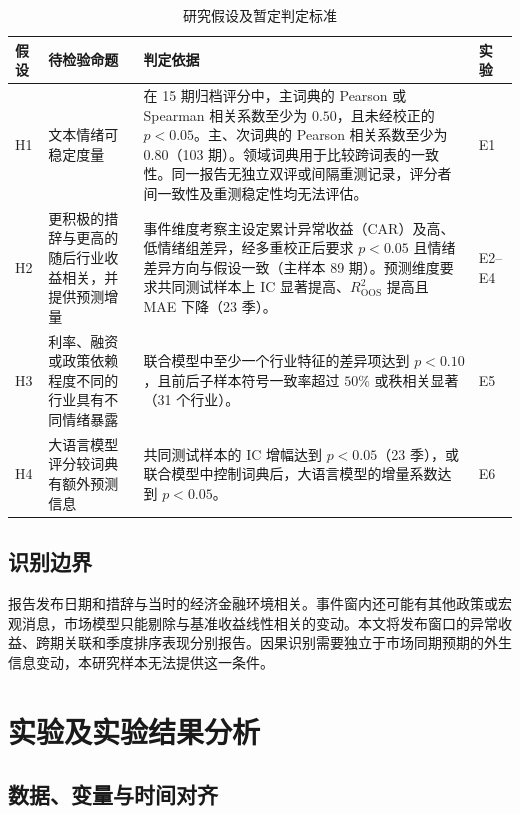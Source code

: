\begin{table}[htbp]
  \centering\small
  \caption{研究假设及暂定判定标准}
  \label{tab:hypothesis-rules}
  \begin{tabularx}{\linewidth}{@{}l p{.22\linewidth} X l@{}}
    \toprule
    假设 & 待检验命题 & 判定依据 & 实验 \\
    \midrule
    H1 & 文本情绪可稳定度量 & 在 15 期归档评分中，主词典的 Pearson 或 Spearman 相关系数至少为 $0.50$，且未经校正的 $p<0.05$。主、次词典的 Pearson 相关系数至少为 $0.80$（103 期）。领域词典用于比较跨词表的一致性。同一报告无独立双评或间隔重测记录，评分者间一致性及重测稳定性均无法评估。 & E1 \\
    H2 & 更积极的措辞与更高的随后行业收益相关，并提供预测增量 & 事件维度考察主设定累计异常收益（CAR）及高、低情绪组差异，经多重校正后要求 $p<0.05$ 且情绪差异方向与假设一致（主样本 89 期）。预测维度要求共同测试样本上 IC 显著提高、$R^2_{\mathrm{OOS}}$ 提高且 MAE 下降（23 季）。 & E2--E4 \\
    H3 & 利率、融资或政策依赖程度不同的行业具有不同情绪暴露 & 联合模型中至少一个行业特征的差异项达到 $p<0.10$，且前后子样本符号一致率超过 $50\%$ 或秩相关显著（31 个行业）。 & E5 \\
    H4 & 大语言模型评分较词典有额外预测信息 & 共同测试样本的 IC 增幅达到 $p<0.05$（23 季），或联合模型中控制词典后，大语言模型的增量系数达到 $p<0.05$。 & E6 \\
    \bottomrule
  \end{tabularx}
\end{table}

\subsection{识别边界}

报告发布日期和措辞与当时的经济金融环境相关。事件窗内还可能有其他政策或宏观消息，市场模型只能剔除与基准收益线性相关的变动。本文将发布窗口的异常收益、跨期关联和季度排序表现分别报告。因果识别需要独立于市场同期预期的外生信息变动，本研究样本无法提供这一条件。

\section{实验及实验结果分析}
\label{sec:data}

\subsection{数据、变量与时间对齐}

